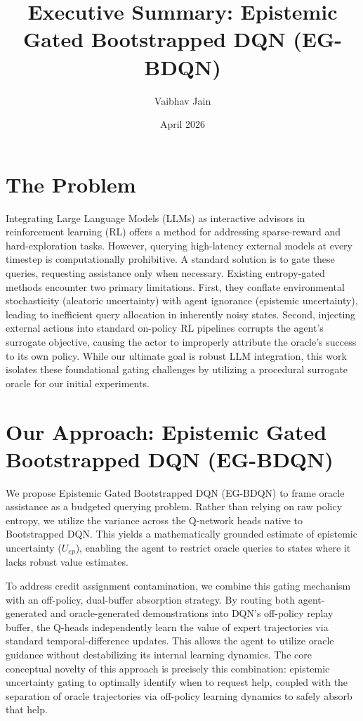 \documentclass[11pt, a4paper]{article}
\title{%
    \textbf{Executive Summary: Epistemic Gated Bootstrapped DQN (EG-BDQN)} \\[0.3em]
}
\author{Vaibhav Jain}
\affil{vaja00001@uni-saarland.de}
\date{April 2026}
\begin{document}
\maketitle

\section*{The Problem}
Integrating Large Language Models (LLMs) as interactive advisors in reinforcement learning (RL) offers a method for addressing sparse-reward and hard-exploration tasks. However, querying high-latency external models at every timestep is computationally prohibitive. A standard solution is to gate these queries, requesting assistance only when necessary. Existing entropy-gated methods encounter two primary limitations. First, they conflate environmental stochasticity (aleatoric uncertainty) with agent ignorance (epistemic uncertainty), leading to inefficient query allocation in inherently noisy states. Second, injecting external actions into standard on-policy RL pipelines corrupts the agent's surrogate objective, causing the actor to improperly attribute the oracle's success to its own policy. While our ultimate goal is robust LLM integration, this work isolates these foundational gating challenges by utilizing a procedural surrogate oracle for our initial experiments.

\section*{Our Approach: Epistemic Gated Bootstrapped DQN (EG-BDQN)}
We propose Epistemic Gated Bootstrapped DQN (EG-BDQN) to frame oracle assistance as a budgeted querying problem. Rather than relying on raw policy entropy, we utilize the variance across the Q-network heads native to Bootstrapped DQN. This yields a mathematically grounded estimate of epistemic uncertainty ($U_{ep}$), enabling the agent to restrict oracle queries to states where it lacks robust value estimates. 

To address credit assignment contamination, we combine this gating mechanism with an off-policy, dual-buffer absorption strategy. By routing both agent-generated and oracle-generated demonstrations into DQN's off-policy replay buffer, the Q-heads independently learn the value of expert trajectories via standard temporal-difference updates. This allows the agent to utilize oracle guidance without destabilizing its internal learning dynamics. The core conceptual novelty of this approach is precisely this combination: epistemic uncertainty gating to optimally identify when to request help, coupled with the separation of oracle trajectories via off-policy learning dynamics to safely absorb that help.
\end{document}

